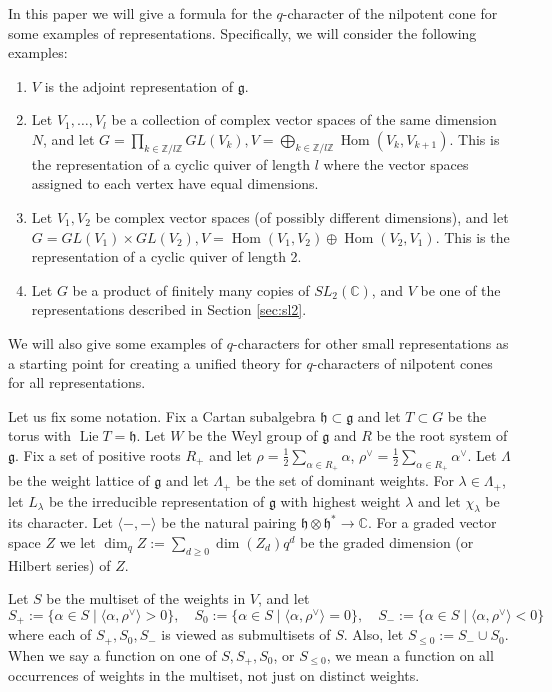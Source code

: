 \documentclass[12pt]{article}
\newcommand{\Z}{\mathbb{Z}}
\newcommand{\C}{\mathbb{C}}
\DeclareMathOperator{\Lie}{Lie}
\theoremstyle{definition}
\theoremstyle{remark}
\newcommand{\g}{\mathfrak{g}}
\newcommand{\h}{\mathfrak{h}}
\DeclareMathOperator{\Hom}{Hom}
\begin{document}
In this paper we will give a formula for the $q$-character of the nilpotent cone for some examples of representations. Specifically, we will consider the following examples:

\begin{enumerate}
    \item $V$ is the adjoint representation of $\g$.\label{eg:adj}
    \item Let $V_1,\dots,V_l$ be a collection of complex vector spaces of the same dimension $N$, and let $G=\prod_{k\in\Z/l\Z}GL(V_k),V=\bigoplus_{k\in\Z/l\Z}\Hom(V_k,V_{k+1})$. This is the representation of a cyclic quiver of length $l$ where the vector spaces assigned to each vertex have equal dimensions.\label{eg:eqdim}
    \item Let $V_1,V_2$ be complex vector spaces (of possibly different dimensions), and let $G=GL(V_1)\times GL(V_2),V=\Hom(V_1,V_2)\oplus\Hom(V_2,V_1)$. This is the representation of a cyclic quiver of length 2.
    \item Let $G$ be a product of finitely many copies of $SL_2(\C)$, and $V$ be one of the representations described in Section \ref{sec:sl2}.
\end{enumerate}

We will also give some examples of $q$-characters for other small representations as a starting point for creating a unified theory for $q$-characters of nilpotent cones for all representations.

Let us fix some notation. Fix a Cartan subalgebra $\h\subset\g$ and let $T\subset G$ be the torus with $\Lie T=\h$. Let $W$ be the Weyl group of $\g$ and $R$ be the root system of $\g$. Fix a set of positive roots $R_+$ and let $\rho=\frac{1}{2}\sum_{\alpha\in R_+}\alpha$, $\rho^\vee=\frac{1}{2}\sum_{\alpha\in R_+}\alpha^\vee$. Let $\Lambda$ be the weight lattice of $\g$ and let $\Lambda_+$ be the set of dominant weights. For $\lambda\in\Lambda_+$, let $L_\lambda$ be the irreducible representation of $\g$ with highest weight $\lambda$ and let $\chi_\lambda$ be its character. Let $\langle-,-\rangle$ be the natural pairing $\h\otimes\h^*\to\C$. For a graded vector space $Z$ we let $\dim_q Z:=\sum_{d\geq 0}\dim(Z_d)q^d$ be the graded dimension (or Hilbert series) of $Z$. 

Let $S$ be the multiset of the weights in $V$, and let 
\[S_+:=\{\alpha\in S\mid\langle\alpha,\rho^\vee\rangle>0\},\quad S_0:=\{\alpha\in S\mid\langle\alpha,\rho^\vee\rangle=0\},\quad S_-:=\{\alpha\in S\mid\langle\alpha,\rho^\vee\rangle<0\}\]
where each of $S_+,S_0,S_-$ is viewed as submultisets of $S$. Also, let $S_{\leq 0}:=S_-\cup S_0$. When we say a function on one of $S,S_+,S_0$, or $S_{\leq 0}$, we mean a function on all occurrences of weights in the multiset, not just on distinct weights.
\end{document}
